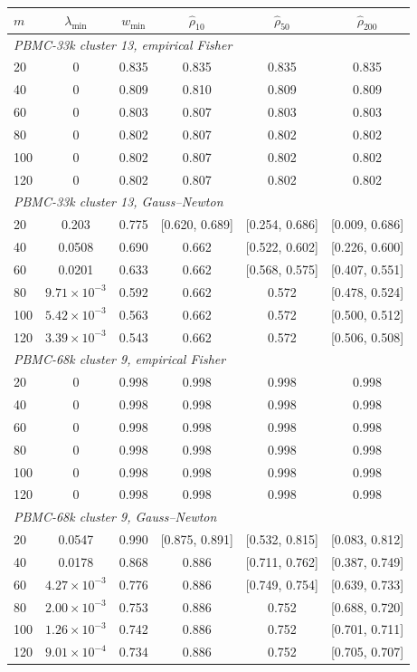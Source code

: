 \begin{tabular}{lccccc}
\toprule
$m$ & $\lambda_{\min}$ & $w_{\min}$ & $\hat\rho_{10}$ & $\hat\rho_{50}$ & $\hat\rho_{200}$ \\
\midrule
\multicolumn{6}{l}{\emph{PBMC-33k cluster 13, empirical Fisher}} \\
20 & 0 & 0.835 & 0.835 & 0.835 & 0.835 \\
40 & 0 & 0.809 & 0.810 & 0.809 & 0.809 \\
60 & 0 & 0.803 & 0.807 & 0.803 & 0.803 \\
80 & 0 & 0.802 & 0.807 & 0.802 & 0.802 \\
100 & 0 & 0.802 & 0.807 & 0.802 & 0.802 \\
120 & 0 & 0.802 & 0.807 & 0.802 & 0.802 \\
\midrule
\multicolumn{6}{l}{\emph{PBMC-33k cluster 13, Gauss--Newton}} \\
20 & 0.203 & 0.775 & [0.620, 0.689] & [0.254, 0.686] & [0.009, 0.686] \\
40 & 0.0508 & 0.690 & 0.662 & [0.522, 0.602] & [0.226, 0.600] \\
60 & 0.0201 & 0.633 & 0.662 & [0.568, 0.575] & [0.407, 0.551] \\
80 & $9.71 \times 10^{-3}$ & 0.592 & 0.662 & 0.572 & [0.478, 0.524] \\
100 & $5.42 \times 10^{-3}$ & 0.563 & 0.662 & 0.572 & [0.500, 0.512] \\
120 & $3.39 \times 10^{-3}$ & 0.543 & 0.662 & 0.572 & [0.506, 0.508] \\
\midrule
\multicolumn{6}{l}{\emph{PBMC-68k cluster 9, empirical Fisher}} \\
20 & 0 & 0.998 & 0.998 & 0.998 & 0.998 \\
40 & 0 & 0.998 & 0.998 & 0.998 & 0.998 \\
60 & 0 & 0.998 & 0.998 & 0.998 & 0.998 \\
80 & 0 & 0.998 & 0.998 & 0.998 & 0.998 \\
100 & 0 & 0.998 & 0.998 & 0.998 & 0.998 \\
120 & 0 & 0.998 & 0.998 & 0.998 & 0.998 \\
\midrule
\multicolumn{6}{l}{\emph{PBMC-68k cluster 9, Gauss--Newton}} \\
20 & 0.0547 & 0.990 & [0.875, 0.891] & [0.532, 0.815] & [0.083, 0.812] \\
40 & 0.0178 & 0.868 & 0.886 & [0.711, 0.762] & [0.387, 0.749] \\
60 & $4.27 \times 10^{-3}$ & 0.776 & 0.886 & [0.749, 0.754] & [0.639, 0.733] \\
80 & $2.00 \times 10^{-3}$ & 0.753 & 0.886 & 0.752 & [0.688, 0.720] \\
100 & $1.26 \times 10^{-3}$ & 0.742 & 0.886 & 0.752 & [0.701, 0.711] \\
120 & $9.01 \times 10^{-4}$ & 0.734 & 0.886 & 0.752 & [0.705, 0.707] \\
\bottomrule
\end{tabular}

